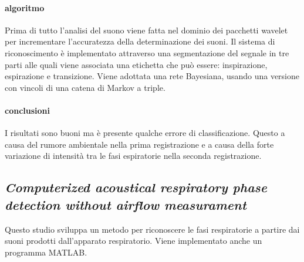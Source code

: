 \begin{frame}
    \paragraph{algoritmo}
      Prima di tutto l'analisi del suono viene fatta nel dominio dei pacchetti wavelet per incrementare l'accuratezza della determinazione dei suoni.
      Il sistema di riconoscimento \`e implementato attraverso una segmentazione del segnale in tre parti alle quali viene associata una etichetta che pu\`o essere: 
      inspirazione, espirazione e transizione. Viene adottata una rete Bayesiana, usando una versione con vincoli di una catena di Markov a triple. 
    \paragraph{conclusioni}
      I risultati sono buoni ma \`e presente qualche errore di classificazione. Questo a causa del rumore ambientale nella prima registrazione e a causa della forte variazione di intensit\`a tra le fasi espiratorie nella seconda registrazione.

  \subsection[Computerized acoustical respiratory phase detection without airflow measurament]{\textit{Computerized acoustical respiratory phase detection without airflow measurament} \cite{CARPDWAM}}

    Questo studio sviluppa un metodo per riconoscere le fasi respiratorie a partire dai suoni prodotti dall'apparato respiratorio. Viene implementato anche un programma MATLAB.

\end{frame}

